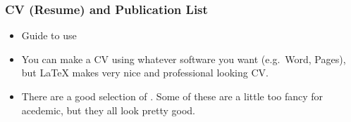\documentclass[letterpaper,10pt,english]{sphinxmanual}
\begin{document}
\subsubsection{CV (Resume) and Publication List}
\label{\detokenize{resource/research/job_and_career:cv-resume-and-publication-list}}\begin{itemize}
\item {} 
Guide to use 

\item {} 
You can make a CV using whatever software you want (e.g. Word,
Pages), but LaTeX makes very nice and professional looking CV.

\item {} 
There are a good selection of . Some of
these are a little too fancy for acedemic, but they all look pretty
good.

\end{itemize}
\end{document}
